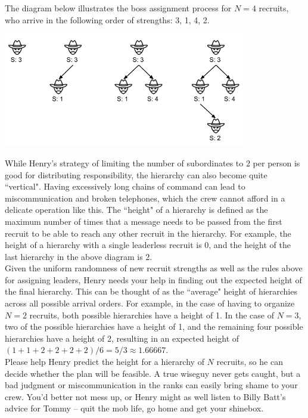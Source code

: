 The diagram below illustrates the boss assignment process for $N = 4$ recruits, who arrive in the following order of strengths: 3, 1, 4, 2.\\

\begin{center}
\includegraphics[width=300pt]{wiseguy}
\end{center}

While Henry's strategy of limiting the number of subordinates to 2 per person is good for distributing responsibility, the hierarchy can also become quite ``vertical". Having excessively long chains of command can lead to miscommunication and broken telephones, which the crew cannot afford in a delicate operation like this. The ``height" of a hierarchy is defined as the maximum number of times that a message needs to be passed from the first recruit to be able to reach any other recruit in the hierarchy. For example, the height of a hierarchy with a single leaderless recruit is 0, and the height of the last hierarchy in the above diagram is 2.\\

Given the uniform randomness of new recruit strengths as well as the rules above for assigning leaders, Henry needs your help in finding out the expected height of the final hierarchy. This can be thought of as the ``average" height of hierarchies across all possible arrival orders. For example, in the case of having to organize $N = 2$ recruits, both possible hierarchies have a height of 1. In the case of $N = 3$, two of the possible hierarchies have a height of 1, and the remaining four possible hierarchies have a height of 2, resulting in an expected height of $(1 + 1 + 2 + 2 + 2 + 2)/6 = 5/3 \approx 1.66667$.\\

Please help Henry predict the height for a hierarchy of $N$ recruits, so he can decide whether the plan will be feasible. A true wiseguy never gets caught, but a bad judgment or miscommunication in the ranks can easily bring shame to your crew. You'd better not mess up, or Henry might as well listen to Billy Batt's advice for Tommy -- quit the mob life, go home and get your shinebox.\\

